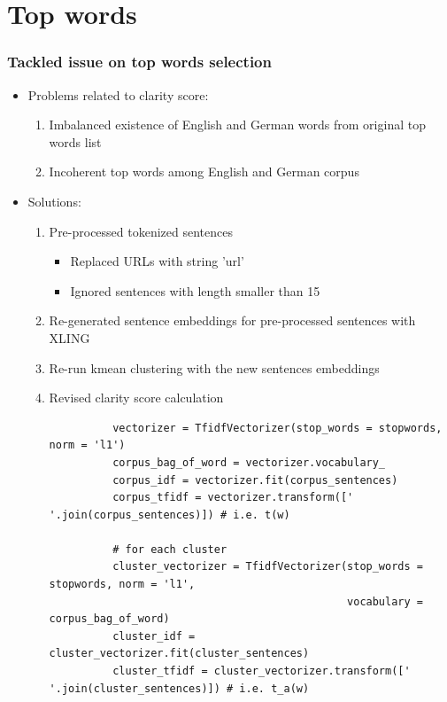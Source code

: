 \documentclass{tum-presentation}
\begin{document}
\section{Top words}
\begin{frame}[fragile]
  \frametitle{Tackled issue on top words selection}
  \begin{itemize}
  \item Problems related to clarity score:
    \begin{enumerate}
        \item Imbalanced existence of English and German words from original top words list 
        \item Incoherent top words among English and German corpus
    \end{enumerate}
  \item Solutions:
    \begin{enumerate}
      \item Pre-processed tokenized sentences
        \begin{itemize}
            \item Replaced URLs with string 'url'
            \item Ignored sentences with length smaller than 15
        \end{itemize}
      \item Re-generated sentence embeddings for pre-processed sentences with XLING
      \item Re-run kmean clustering with the new sentences embeddings
      \item Revised clarity score calculation
        \begin{itemize}
          \begin{lstlisting}
          vectorizer = TfidfVectorizer(stop_words = stopwords, norm = 'l1')
          corpus_bag_of_word = vectorizer.vocabulary_
          corpus_idf = vectorizer.fit(corpus_sentences)
          corpus_tfidf = vectorizer.transform([' '.join(corpus_sentences)]) # i.e. t(w)
    
          # for each cluster
          cluster_vectorizer = TfidfVectorizer(stop_words = stopwords, norm = 'l1', 
                                               vocabulary = corpus_bag_of_word)
          cluster_idf = cluster_vectorizer.fit(cluster_sentences)
          cluster_tfidf = cluster_vectorizer.transform([' '.join(cluster_sentences)]) # i.e. t_a(w)
          \end{lstlisting}
        \end{itemize}
    \end{enumerate}
  \end{itemize}
\end{frame}
\end{document}
